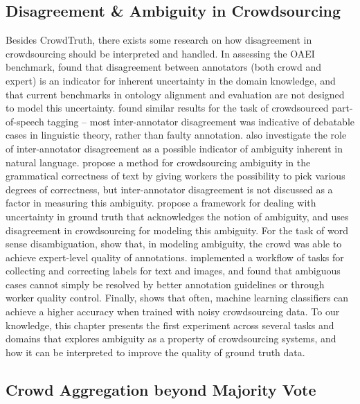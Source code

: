 \subsection{Disagreement \& Ambiguity in Crowdsourcing}

Besides CrowdTruth, there exists some research on how disagreement in crowdsourcing should be interpreted and handled. In assessing the OAEI benchmark, \cite{cheatham2014conference} found that disagreement between annotators (both crowd and expert) is an indicator for inherent uncertainty in the domain knowledge, and that current benchmarks in ontology alignment and evaluation are not designed to model this uncertainty. \cite{plank-hovy-sogaard:2014:P14-2} found similar results for the task of crowdsourced part-of-speech tagging -- most inter-annotator disagreement was indicative of debatable cases in linguistic theory, rather than faulty annotation. \cite{Bayerl2011} also investigate the role of inter-annotator disagreement as a possible indicator of ambiguity inherent in natural language. \cite{lau2014measuring} propose a method for crowdsourcing ambiguity in the grammatical correctness of text by giving workers the possibility to pick various degrees of correctness, but inter-annotator disagreement is not discussed as a factor in measuring this ambiguity. \cite{schaekermann2016} propose a framework for dealing with uncertainty in ground truth that acknowledges the notion of ambiguity, and uses disagreement in crowdsourcing for modeling this ambiguity. For the task of word sense disambiguation, \cite{jurgens2013embracing} show that, in modeling ambiguity, the crowd was able to achieve expert-level quality of annotations. \cite{Chang:2017:Revolt} implemented a workflow of tasks for collecting and correcting labels for text and images, and found that ambiguous cases cannot simply be resolved by better annotation guidelines or through worker quality control. Finally, \cite{lin2014re} shows that often, machine learning classifiers can achieve a higher accuracy when trained with noisy crowdsourcing data. To our knowledge, this chapter presents the first experiment across several tasks and domains that explores ambiguity as a property of crowdsourcing systems, and how it can be interpreted to improve the quality of ground truth data.


\subsection{Crowd Aggregation beyond Majority Vote}

